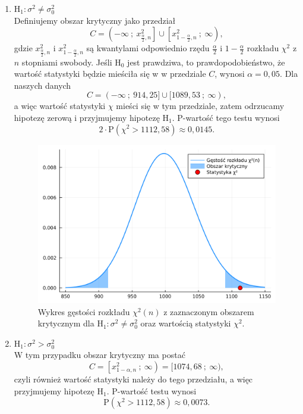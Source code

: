 \documentclass[12pt]{mwart}
\begin{document}
	\begin{enumerate}[label=(\textbf{\alph*})]
		
		\item {\boldmath $\mathrm{H_1}: \sigma^2 \neq \sigma_0^2$}\\
		Definiujemy obszar krytyczny jako przedział
		$$ C = \left( -\infty \ ; \ x^2_{\frac{\alpha}{2}, n} \right] \cup \left[ x^2_{1 - \frac{\alpha}{2}, n} \ ; \ \infty \right), $$
		gdzie  $x^2_{\frac{\alpha}{2}, n}$ i $x^2_{1 - \frac{\alpha}{2}, n}$ są kwantylami odpowiednio rzędu $\frac{\alpha}{2}$ i $1 - \frac{\alpha}{2}$ rozkładu $\chi^2$ z $n$ stopniami swobody. Jeśli $\mathrm{H_0}$ jest prawdziwa, to prawdopodobieństwo, że wartość statystyki będzie mieściła się w w przedziale $C$, wynosi \mbox{$\alpha = 0,05$}. Dla naszych danych
		$$ C = (-\infty \ ; \ 914,25] \cup [1089,53 \ ; \ \infty), $$
		a więc wartość statystyki $\chi$ mieści się w tym przedziale, zatem odrzucamy hipotezę zerową i przyjmujemy hipotezę $\mathrm{H_1}$.
		P-wartość tego testu wynosi
		$$ 2\cdot\mathrm{P}\left(\chi^2 > 1112,58 \right) \approx 0,0145. $$
		
		\begin{figure}[H]
			\centering
			\includegraphics[scale=0.11]{images/wariancja_a.png}
			\caption{Wykres gęstości rozkładu $\chi^2(n)$ z zaznaczonym obszarem krytycznym dla $\mathrm{H_1}: \sigma^2 \neq \sigma_0^2$ oraz wartością statystyki $\chi^2$.}
		\end{figure}
		
		\item {\boldmath $\mathrm{H_1}: \sigma^2 > \sigma_0^2$}\\
		W tym przypadku obszar krytyczny ma postać
		$$ C = \left[ x^2_{1 - \alpha, n} \ ; \ \infty \right) = [1074,68 \ ; \ \infty), $$
		czyli również wartość statystyki należy do tego przedziału, a więc przyjmujemy hipotezę $\mathrm{H_1}$.
		P-wartość testu wynosi
		$$ \mathrm{P}\left(\chi^2 > 1112,58 \right) \approx 0,0073. $$
		

\end{enumerate}
\end{document}
